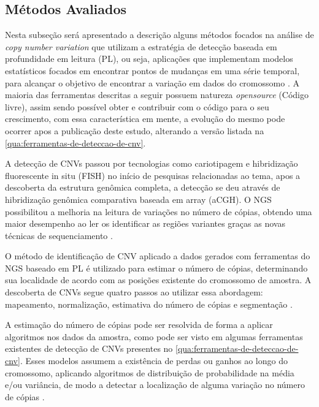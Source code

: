 \subsection{Métodos Avaliados} 

Nesta subseção será apresentado a descrição alguns métodos focados na análise de \textit{copy number variation} que utilizam a estratégia de detecção baseada em profundidade em leitura (PL), ou seja, aplicações que implementam modelos estatísticos focados em encontrar pontos de mudanças em uma série temporal, para alcançar o objetivo de encontrar a variação em dados do cromossomo \cite{Zhao2013}. A maioria das ferramentas descritas a seguir possuem natureza \textit{opensource} (Código livre), assim sendo possível obter e contribuir com o código para o seu crescimento, com essa característica em mente, a evolução do mesmo pode ocorrer apos a publicação deste estudo, alterando a versão listada na \autoref{qua:ferramentas-de-deteccao-de-cnv}.

A detecção de CNVs passou por tecnologias como cariotipagem e hibridização fluorescente in situ (FISH) no início de pesquisas relacionadas ao tema, apos a descoberta da estrutura genômica completa, a detecção se deu através de hibridização genômica comparativa baseada em array (aCGH). O NGS possibilitou a melhoria na leitura de variações no número de cópias, obtendo uma maior desempenho ao ler os identificar as regiões variantes graças as novas técnicas de sequenciamento \cite{Zhao2013}. 

O método de identificação de CNV aplicado a dados gerados com ferramentas do NGS baseado em PL é utilizado para estimar o número de cópias, determinando sua localidade de acordo com as posições existente do cromossomo de amostra. A descoberta de CNVs segue quatro passos ao utilizar essa abordagem: mapeamento, normalização, estimativa do número de cópias e segmentação \cite{Zhao2013}.

A estimação do número de cópias pode ser resolvida de forma a aplicar algoritmos nos dados da amostra, como pode ser visto em algumas ferramentas existentes de detecção de CNVs presentes no \autoref{qua:ferramentas-de-deteccao-de-cnv}. Esses modelos assumem a existência de perdas ou ganhos ao longo do cromossomo, aplicando algoritmos de distribuição de probabilidade na média e/ou variância, de modo a detectar a localização de alguma variação no número de cópias \cite{Zhao2013}.



